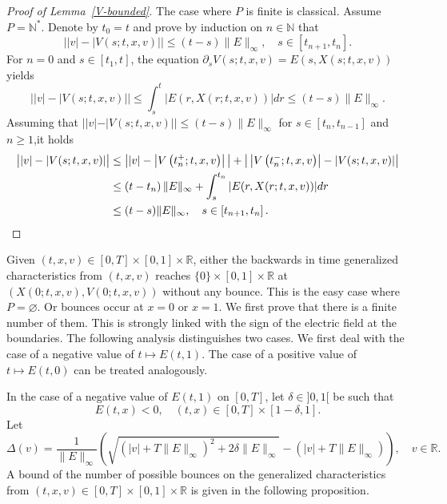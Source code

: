 \documentclass[10pt]{amsart}
\theoremstyle{definition}\newtheorem{defi}[theo]{Definition}\newtheorem{rema}[theo]{Remark}\newtheorem{exam}[theo]{Example}\newtheorem{exem}[theo]{Example}\newtheorem{nota}[theo]{Notation}
\newcommand{\R}{\mathbb{R}}
\newcommand{\N}{\mathbb{N}}
\begin{document}
\begin{proof}[{Proof of Lemma~\ref{V-bounded}}] The case where $P$ is finite is classical. Assume $P=\N^*$. Denote by $t_0=t$ and prove by induction on $n
\in \N$ that
\begin{equation}\label{property-lemma-V-bounded}
\big | |v|-|V(s;t,x,v)| \big | \leq (t-s) \| E \|_{\infty }, \quad s \in \left[t_{n+1},t_n\right].
\end{equation}
For $n=0$ and $s \in [t_1,t]$, the equation $\partial_s V(s;t,x,v) = E(s,X(s;t,x,v))$ yields
\[
\big| |v| - |V(s;t,x,v)| \big| \leq \int_{s}^t \big|E(r,X(r;t,x,v))\big| dr \leq (t-s) \| E \|_{\infty }.
\]
Assuming that $| |v| - |V(s;t,x,v)| | \leq (t-s) \| E \|_{\infty }$ for $s \in [t_n,t_{n-1}]$ and $n \geq 1$,\linebreak it holds
\begin{align*}
\big| |v| - |V(s;t,x,v)| \big| &\leq \big| |v| - \left|V\left(t_n^+;t,x,v\right)\right|\big| + \big| \left|V\left(t_n^-;t,x,v\right)\right| - |V(s;t,x,v)|\big| \\
&\leq \left(t-t_n\right) \| E \|_{\infty } + \int_s^{t_n} |E(r,X(r;t,x,v))| dr \\
&\leq (t-s) \| E \|_{\infty }, \quad s \in \left[t_{n+1},t_n\right].\qedhere
\end{align*}
\end{proof}

Given $(t,x,v) \in [0,T] \times [0,1] \times \R$, either the backwards in time generalized characteristics from $(t,x,v)$ reaches $\{ 0\} \times [0,1]
\times \R $ at $(X(0;t,x,v),V(0;t,x,v))$ without any bounce. This is the easy case where $P = \varnothing$. Or bounces occur at $x=0$ or $x=1$. We first prove that there is a finite number of them. This is strongly linked with the sign of the electric field at the boundaries. The following analysis distinguishes two cases. We first deal with the case of a negative value of $t \mapsto E(t,1)$. The case of a positive value of $t \mapsto E(t,0)$ can be treated analogously.


In the case of a negative value of $E(t,1)$ on $[0,T]$, let $\delta \in]0,1[$ be such that
\begin{equation}\label{E-bande}
E(t,x)<0, \quad (t,x) \in [0,T] \times [1-\delta, 1].
\end{equation}
Let
\begin{equation}\label{df-Delta(v)}
\Delta(v) = \frac{1}{\|E\|_{\infty }} \left (\sqrt{ \left (|v| + T \| E \|_{\infty } \right)^2 + 2 \delta \|E\|_{\infty } } - \left (|v| + T \| E \|_{\infty } \right) \right), \quad v \in \R.
\end{equation}
A bound of the number of possible bounces on the generalized characteristics from \linebreak
$(t,x,v)\in [0,T] \times [0,1] \times \R$ is given in the following proposition.
\end{document}
